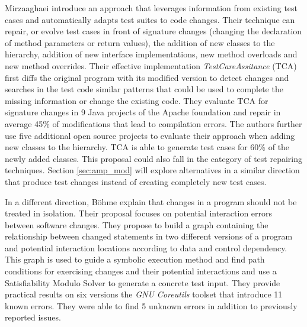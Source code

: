 Mirzaaghaei \etal\cite{Mirzaaghaei2012,mirzaaghaei2014automatic} introduce an approach that leverages information from existing test cases and automatically adapts test suites to code changes.
Their technique can repair, or evolve test cases in front of signature changes (\ie changing the declaration of method parameters or return values), the addition of new classes to the hierarchy, addition of new interface implementations, new method overloads and new method overrides. 
Their effective implementation \emph{TestCareAssitance} (TCA) first diffs the original program with its modified version to detect changes and searches in the test code similar patterns that could be used to complete the missing information or change the existing code. 
They evaluate TCA for signature changes in 9 Java projects of the Apache foundation and repair in average 45\% of modifications that lead to compilation errors. 
The authors further use five additional open source projects to evaluate their approach when adding new classes to the hierarchy. 
TCA is able to generate test cases for 60\% of the newly added classes.
This proposal could also fall in the category of test repairing techniques. 
Section \autoref{sec:amp_mod} will explore alternatives in a similar direction that produce test changes instead of creating completely new test cases.

In a different direction, Böhme \etal\cite{bohme2013regression} explain that changes in a program should not be treated in isolation. 
Their proposal focuses on potential interaction errors between software changes. 
They propose to build a graph containing the relationship between changed statements in two different versions of a program and potential interaction locations according to data and control dependency. 
This graph is used to guide a symbolic execution method and find path conditions for exercising changes and their potential interactions and use a Satisfiability Modulo Solver to generate a concrete test input. 
They provide practical results on six versions the \emph{GNU Coreutils} toolset that introduce 11 known errors. They were able to find 5 unknown errors in addition to previously reported issues.

